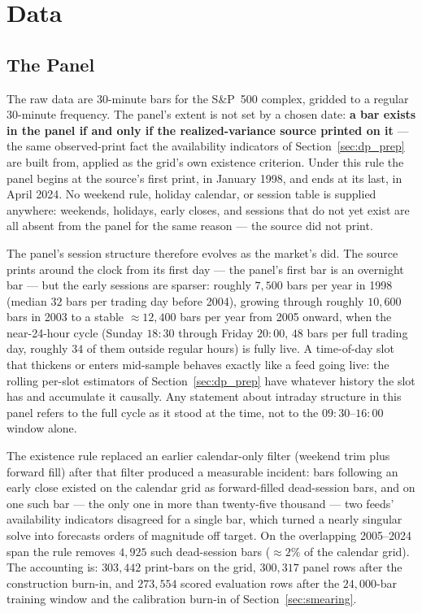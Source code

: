 \section{Data}
\label{sec:data_prep}


\subsection{The Panel}
\label{sec:dp_data}

The raw data are 30-minute bars for the S\&P~500 complex, gridded to a
regular 30-minute frequency. The panel's extent is not set by a chosen
date: \textbf{a bar exists in the panel if and only if the
realized-variance source printed on it} --- the same observed-print fact
the availability indicators of Section~\ref{sec:dp_prep} are built from,
applied as the grid's own existence criterion. Under this rule the panel
begins at the source's first print, in January 1998, and ends at its last,
in April 2024. No weekend rule, holiday calendar, or session table is
supplied anywhere: weekends, holidays, early closes, and sessions that do
not yet exist are all absent from the panel for the same reason --- the
source did not print.

The panel's session structure therefore evolves as the market's did. The
source prints around the clock from its first day --- the panel's first
bar is an overnight bar --- but the early sessions are sparser: roughly
$7{,}500$ bars per year in 1998 (median $32$ bars per trading day before
2004), growing through roughly $10{,}600$ bars in 2003 to a stable
$\approx 12{,}400$ bars per year from 2005 onward, when the near-24-hour
cycle (Sunday $18{:}30$ through Friday $20{:}00$, $48$ bars per full
trading day, roughly $34$ of them outside regular hours) is fully live. A
time-of-day slot that thickens or enters mid-sample behaves exactly like
a feed going live: the rolling per-slot estimators of
Section~\ref{sec:dp_prep} have whatever history the slot has and
accumulate it causally. Any statement about intraday structure in this
panel refers to the full cycle as it stood at the time, not to the
$09{:}30$--$16{:}00$ window alone.

The existence rule replaced an earlier calendar-only filter (weekend trim
plus forward fill) after that filter produced a measurable incident: bars
following an early close existed on the calendar grid as forward-filled
dead-session bars, and on one such bar --- the only one in more than twenty-five
thousand --- two feeds' availability indicators disagreed for a single
bar, which turned a nearly singular solve into forecasts orders of magnitude off target. On the
overlapping 2005--2024 span the rule removes $4{,}925$ such dead-session
bars ($\approx 2\%$ of the calendar grid).
The accounting is: $303{,}442$ print-bars on the grid, $300{,}317$ panel
rows after the construction burn-in, and $273{,}554$ scored evaluation rows
after the $24{,}000$-bar training window and the calibration burn-in of
Section~\ref{sec:smearing}.

